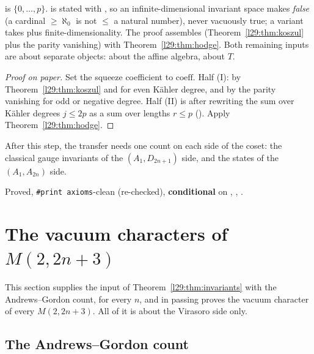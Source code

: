 \begin{dictionary}
 is $\{0,\dots,p\}$.  is stated with , so an
infinite-dimensional invariant space makes  \emph{false} (a cardinal $\ge\aleph_0$ is not $\le$ a natural
number), never vacuously true; a  variant takes  plus finite-dimensionality. The
proof assembles  (Theorem~\ref{l29:thm:koszul} plus the parity vanishing) with
Theorem~\ref{l29:thm:hodge}. Both remaining inputs are about separate objects:  about the affine algebra,
 about $T$.
\end{dictionary}

\begin{proof}[Proof on paper]
Set the squeeze coefficient to $\mathrm{coeff}$. Half (I): by Theorem~\ref{l29:thm:koszul} and  for even
Kähler degree, and by the parity vanishing for odd or negative degree. Half (II) is  after rewriting the sum
over Kähler degrees $j\le2p$ as a sum over lengths $r\le p$ (). Apply Theorem~\ref{l29:thm:hodge}.
\end{proof}

\begin{physics}
After this step, the transfer needs one count on each side of the coset: the classical gauge invariants of the
$(A_1,D_{2n+1})$ side, and the states of the $(A_1,A_{2n})$ side.
\end{physics}

\begin{status}
Proved, \texttt{\#print axioms}-clean (re-checked), \textbf{conditional} on , , .
\end{status}

\section{The vacuum characters of \texorpdfstring{$M(2,2n+3)$}{M(2,2n+3)}}\label{l29:sec:char}

This section supplies the input  of Theorem~\ref{l29:thm:invariants} with the Andrews--Gordon count, for
every $n$, and in passing proves the vacuum character of every $M(2,2n+3)$. All of it is about the Virasoro side
only.

\subsection{The Andrews--Gordon count}

